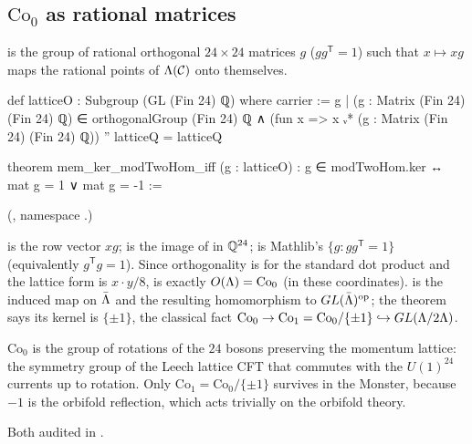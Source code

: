 \subsection{\texorpdfstring{$\mathrm{Co}_0$}{Co0} as rational matrices}

\begin{definition}[$\mathrm{Co}_0$]\label{ch21:def:latticeO}
 is the group of rational orthogonal $24\times24$ matrices $g$ ($gg^{\mathsf T}=1$) such
that $x\mapsto xg$ maps the rational points of $\Lambda(\mathcal{C})$ onto themselves.
\end{definition}
\begin{leancode}
def latticeO : Subgroup (GL (Fin 24) ℚ) where
  carrier := {g | (g : Matrix (Fin 24) (Fin 24) ℚ) ∈ orthogonalGroup (Fin 24) ℚ ∧
    (fun x => x ᵥ* (g : Matrix (Fin 24) (Fin 24) ℚ)) '' latticeQ = latticeQ}
\end{leancode}
\begin{leancode}
theorem mem_ker_modTwoHom_iff (g : latticeO) : g ∈ modTwoHom.ker ↔ mat g = 1 ∨ mat g = -1 :=
\end{leancode}
(, namespace .)
\begin{dictionary}
 is the row vector $xg$;  is the image of  in
${\mathbb{Q}}^{24}$;  is Mathlib's $\{g: gg^{\mathsf T}=1\}$ (equivalently
$g^{\mathsf T}g=1$).  Since orthogonality is for the standard dot product and the lattice form is
$x\cdot y/8$,  is exactly $O({\Lambda})=\mathrm{Co}_0$ (in these coordinates).
 is the induced map on $\bar{\Lambda}$ and  the resulting homomorphism to
$GL(\bar{\Lambda})^{\mathrm{op}}$; the theorem says its kernel is $\{\pm1\}$, the classical fact
$\mathrm{Co}_0\to\mathrm{Co}_1=\mathrm{Co}_0/\{\pm1\}\hookrightarrow GL({\Lambda}/2{\Lambda})$.
\end{dictionary}
\begin{physics}
$\mathrm{Co}_0$ is the group of rotations of the $24$ bosons preserving the momentum lattice: the
symmetry group of the Leech lattice CFT that commutes with the $U(1)^{24}$ currents up to rotation.
Only $\mathrm{Co}_1=\mathrm{Co}_0/\{\pm1\}$ survives in the Monster, because $-1$ is the orbifold
reflection, which acts trivially on the orbifold theory.
\end{physics}
\begin{status}
Both audited in .
\end{status}

